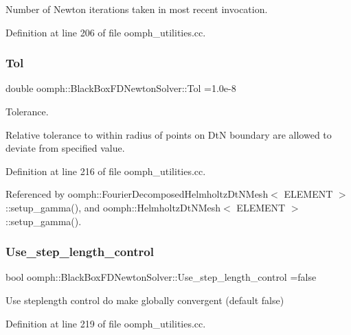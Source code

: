 Number of Newton iterations taken in most recent invocation. 



Definition at line 206 of file oomph\+\_\+utilities.\+cc.

\mbox{\label{namespaceoomph_1_1BlackBoxFDNewtonSolver_a4bacc59c8e1194e553f698530e9e945e}} 
\subsubsection{\texorpdfstring{Tol}{Tol}}
{\footnotesize\ttfamily double oomph\+::\+Black\+Box\+F\+D\+Newton\+Solver\+::\+Tol =1.\+0e-\/8}



Tolerance. 

Relative tolerance to within radius of points on DtN boundary are allowed to deviate from specified value. 

Definition at line 216 of file oomph\+\_\+utilities.\+cc.



Referenced by oomph\+::\+Fourier\+Decomposed\+Helmholtz\+Dt\+N\+Mesh$<$ E\+L\+E\+M\+E\+N\+T $>$\+::setup\+\_\+gamma(), and oomph\+::\+Helmholtz\+Dt\+N\+Mesh$<$ E\+L\+E\+M\+E\+N\+T $>$\+::setup\+\_\+gamma().

\mbox{\label{namespaceoomph_1_1BlackBoxFDNewtonSolver_afd90cb451fb7ae5a8e30cab0a1884568}} 
\subsubsection{\texorpdfstring{Use\+\_\+step\+\_\+length\+\_\+control}{Use\_step\_length\_control}}
{\footnotesize\ttfamily bool oomph\+::\+Black\+Box\+F\+D\+Newton\+Solver\+::\+Use\+\_\+step\+\_\+length\+\_\+control =false}



Use steplength control do make globally convergent (default false) 



Definition at line 219 of file oomph\+\_\+utilities.\+cc.

